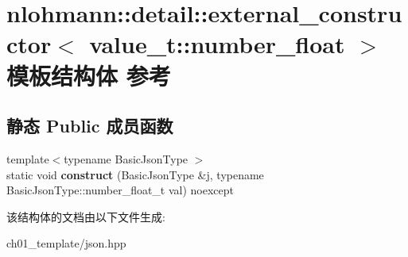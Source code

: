\hypertarget{structnlohmann_1_1detail_1_1external__constructor_3_01value__t_1_1number__float_01_4}{}\section{nlohmann\+::detail\+::external\+\_\+constructor$<$ value\+\_\+t\+::number\+\_\+float $>$ 模板结构体 参考}
\label{structnlohmann_1_1detail_1_1external__constructor_3_01value__t_1_1number__float_01_4}
\subsection*{静态 Public 成员函数}
\begin{DoxyCompactItemize}
\item 
\mbox{\label{structnlohmann_1_1detail_1_1external__constructor_3_01value__t_1_1number__float_01_4_a669df5a4d258b588e67f747c6d656cdb}} 
{\footnotesize template$<$typename Basic\+Json\+Type $>$ }\\static void {\bfseries construct} (Basic\+Json\+Type \&j, typename Basic\+Json\+Type\+::number\+\_\+float\+\_\+t val) noexcept
\end{DoxyCompactItemize}


该结构体的文档由以下文件生成\+:\begin{DoxyCompactItemize}
\item 
ch01\+\_\+template/json.\+hpp\end{DoxyCompactItemize}
